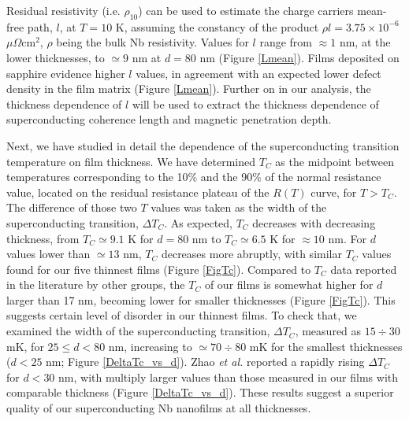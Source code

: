 \documentclass[reprint,onecolumn,superscriptaddress,a4paper,nofootinbib,floatfix]{revtex4-1}
\begin{document}
Residual resistivity (i.e. $\rho_{10}$) can be used to estimate the charge carriers mean-free path, $l$, at $T = 10$ K, assuming the constancy of the product $\rho l = 3.75 \times 10^{-6}$ $\mu\Omega$cm$^2$, $\rho$ being the bulk Nb resistivity.\cite{Ashcroft} Values for $l$ range from $\approx 1$ nm, at the lower thicknesses, to $\simeq 9$ nm at $d = 80$ nm (Figure \ref{Lmean}). Films deposited on sapphire evidence higher $l$ values, in agreement with an expected lower defect density in the film matrix (Figure \ref{Lmean}).
Further on in our analysis, the thickness dependence of $l$ will be used to extract the thickness dependence of superconducting coherence length and magnetic penetration depth.

Next, we have studied in detail the dependence of the superconducting transition temperature on film thickness. We have determined $T_C$ as the midpoint between temperatures corresponding to the 10\% and the 90\% of the normal resistance value, located on the residual resistance plateau of the $R(T)$ curve, for $T > T_C$. The difference of those two $T$ values was taken as the width of the superconducting transition, $\Delta T_C$. As expected, $T_C$ decreases with decreasing thickness, from $T_C \simeq 9.1$ K for $d = 80$ nm to $T_C \simeq 6.5$ K for $\approx 10$ nm. For $d$ values lower than $\simeq 13$ nm, $T_C$ decreases more abruptly, with similar $T_C$ values found for our five thinnest films (Figure \ref{FigTc}). Compared to $T_C$ data reported in the literature by other groups, the $T_C$ of our films is somewhat higher for $d$ larger than 17 nm, becoming lower for smaller thicknesses (Figure \ref{FigTc}). This suggests certain level of disorder in our thinnest films. To check that, we examined the width of the superconducting transition, $\Delta T_C$, measured as $15\div30$ mK, for $25 \leq d < 80$ nm, increasing to $\simeq 70 \div 80$ mK for the smallest thicknesses ($d < 25$ nm; Figure \ref{DeltaTc_vs_d}). Zhao \textit{et al.} \cite{Zhao} reported a rapidly rising $\Delta T_C$ for $d < 30$ nm, with multiply larger values than those measured in our films with comparable thickness (Figure \ref{DeltaTc_vs_d}). These results suggest a superior quality of our superconducting Nb nanofilms at all thicknesses. 
\end{document}
